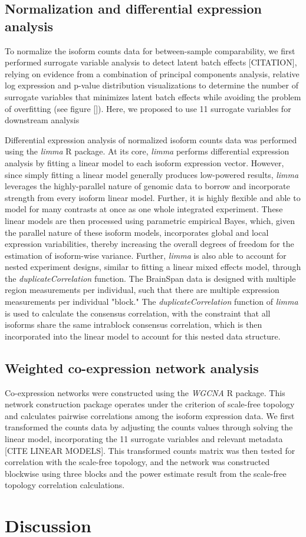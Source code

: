 \subsection{Normalization and differential expression analysis}
To normalize the isoform counts data for between-sample comparability, we first performed surrogate variable analysis to detect latent batch effects [CITATION], relying on evidence from a combination of principal components analysis, relative log expression and p-value distribution visualizations to determine the number of surrogate variables that minimizes latent batch effects while avoiding the problem of overfitting (see figure []). Here, we proposed to use 11 surrogate variables for downstream analysis\par
Differential expression analysis of normalized isoform counts data was performed using the \textit{limma} R package. At its core, \textit{limma} performs differential expression analysis by fitting a linear model to each isoform expression vector. However, since simply fitting a linear model generally produces low-powered results, \textit{limma} leverages the highly-parallel nature of genomic data to borrow and incorporate strength from every isoform linear model. Further, it is highly flexible and able to model for many contrasts at once as one whole integrated experiment. These linear models are then processed using parametric empirical Bayes, which, given the parallel nature of these isoform models, incorporates global and local expression variabilities, thereby increasing the overall degrees of freedom for the estimation of isoform-wise variance. Further, \textit{limma} is also able to account for nested experiment designs, similar to fitting a linear mixed effects model, through the \textit{duplicateCorrelation} function. The BrainSpan data is designed with multiple region measurements per individual, such that there are multiple expression measurements per individual "block." The \textit{duplicateCorrelation} function of \textit{limma} is used to calculate the consensus correlation, with the constraint that all isoforms share the same intrablock consensus correlation, which is then incorporated into the linear model to account for this nested data structure. 
\subsection{Weighted co-expression network analysis}
Co-expression networks were constructed using the \textit{WGCNA} R package. This network construction package operates under the criterion of scale-free topology and calculates pairwise correlations among the isoform expression data. We first transformed the counts data by adjusting the counts values through solving the linear model, incorporating the 11 surrogate variables and relevant metadata [CITE LINEAR MODELS]. This transformed counts matrix was then tested for correlation with the scale-free topology, and the network was constructed blockwise using three blocks and the power estimate result from the scale-free topology correlation calculations. 
\section{Discussion}